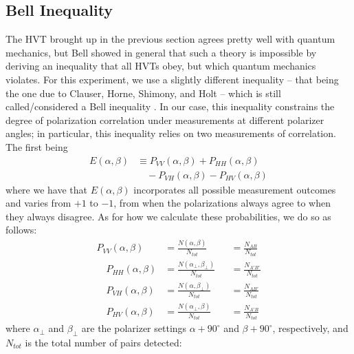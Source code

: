 \documentclass[twocolumn,amsmath,amssymb,pra]{revtex4-2}
\begin{document}
\subsection{Bell Inequality}
The HVT brought up in the previous section agrees pretty well with quantum mechanics, but Bell showed in general that such a theory is impossible by deriving an inequality that all HVTs obey, but which quantum mechanics violates. For this experiment, we use a slightly different inequality -- that being the one due to Clauser, Horne, Shimony, and Holt -- which is still called/considered a Bell inequality \cite{D_M}. In our case, this inequality constrains the degree of polarization correlation under measurements at different polarizer angles; in particular, this inequality relies on two measurements of correlation. The first being
\begin{equation}
    \begin{aligned}
        E(\alpha, \beta)
        &\equiv
        P_{VV}(\alpha, \beta) + P_{HH}(\alpha, \beta) 
        \\
        &\quad
        - P_{VH}(\alpha, \beta) - P_{HV}(\alpha, \beta)
    \end{aligned}
    \label{eq:E}
\end{equation}
where we have that $E(\alpha, \beta)$ incorporates all possible measurement outcomes and varies from $+1$ to $-1$, from when the polarizations always agree to when they always disagree. As for how we calculate these probabilities, we do so as follows: 
\begin{equation}
    \begin{alignedat}{2}
        P_{VV}(\alpha, \beta)
        &=
        \frac{N(\alpha, \beta)}{N_{tot}}
        &&=
        \frac{N_{AB}}{N_{tot}}
        \\
        \quad 
        P_{HH}(\alpha, \beta)
        &=
        \frac{N(\alpha_{\perp}, \beta_{\perp})}{N_{tot}}
        &&=
        \frac{N_{A'B'}}{N_{tot}}
        \\
        \quad
        P_{VH}(\alpha, \beta)
        &=
        \frac{N(\alpha, \beta_{\perp})}{N_{tot}}
        &&=
        \frac{N_{AB'}}{N_{tot}}
        \\
        \quad
        P_{HV}(\alpha, \beta)
        &=
        \frac{N(\alpha_{\perp}, \beta)}{N_{tot}}
        &&=
        \frac{N_{A'B}}{N_{tot}}
    \end{alignedat}
\end{equation}
where $\alpha_{\perp}$ and $\beta_{\perp}$ are the polarizer settings $\alpha + 90^{\circ}$ and $\beta + 90^{\circ}$, respectively, and $N_{tot}$ is the total number of pairs detected:
\end{document}
